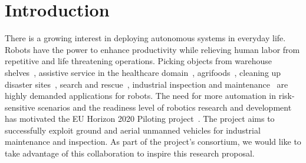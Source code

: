 \section{Introduction}
\label{sec:Introduction}


There is a growing interest in deploying autonomous systems in everyday life. Robots have the power to enhance productivity while relieving human labor from repetitive and life threatening operations. Picking objects from warehouse shelves~\cite{correll2016analysis}, assistive service in the healthcare domain~\cite{cooper2020ari}, agrifoods~\cite{duckett2018agricultural}, cleaning up disaster sites~\cite{nishikawa2019disaster}, search and rescue~\cite{negrello2018walk}, industrial inspection and maintenance~\cite{lattanzi2017review} are highly demanded applications for robots. The need for more automation in risk-sensitive scenarios and the readiness level of robotics research and development has motivated the EU Horizon 2020 Piloting project~\cite{eu-piloting-2020}. The project aims to successfully exploit ground and aerial unmanned vehicles for industrial maintenance and inspection. As part of the project's consortium, we would like to take advantage of this collaboration to inspire this research proposal.     

